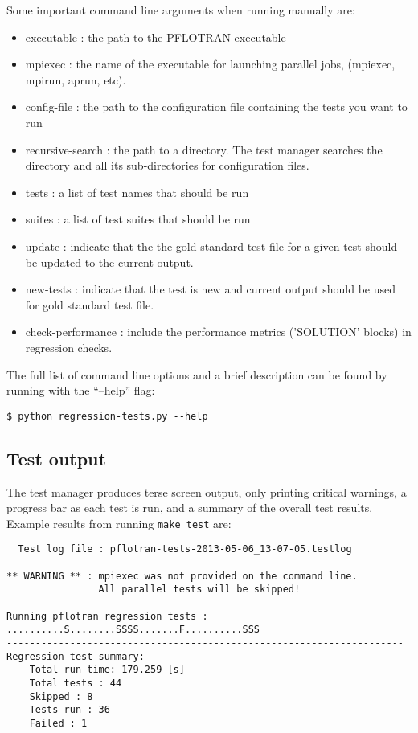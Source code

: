 Some important command line arguments when running manually are:
\begin{itemize}
\item executable : the path to the PFLOTRAN executable
\item mpiexec : the name of the executable for launching parallel
  jobs, (mpiexec, mpirun, aprun, etc).
\item config-file : the path to the configuration file containing the
  tests you want to run
\item recursive-search : the path to a directory. The test manager
  searches the directory and all its sub-directories for configuration
  files.
\item tests : a list of test names that should be run
\item suites : a list of test suites that should be run
\item update : indicate that the the gold standard test file for a
  given test should be updated to the current output.
\item new-tests : indicate that the test is new and current output
  should be used for gold standard test file.
\item check-performance : include the performance metrics ('SOLUTION'
  blocks) in regression checks.
\end{itemize}

The full list of command line options and a brief description can be
found by running with the ``--help'' flag:
\begin{verbatim}
$ python regression-tests.py --help
\end{verbatim}

\subsection{Test output}
The test manager produces terse screen output, only printing critical
warnings, a progress bar as each test is run, and a summary of the
overall test results. Example results from running \texttt{make test} are:

\begin{mdframed}
\small
\begin{verbatim}
  Test log file : pflotran-tests-2013-05-06_13-07-05.testlog

** WARNING ** : mpiexec was not provided on the command line.
                All parallel tests will be skipped!

Running pflotran regression tests :
..........S........SSSS.......F..........SSS
---------------------------------------------------------------------
Regression test summary:
    Total run time: 179.259 [s]
    Total tests : 44
    Skipped : 8
    Tests run : 36
    Failed : 1
\end{verbatim}
\normalsize
\end{mdframed}

